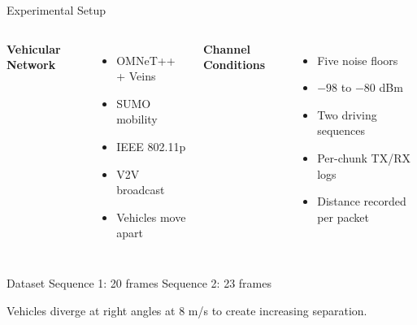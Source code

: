\documentclass[aspectratio=169]{beamer}
\begin{document}
\begin{frame}{Experimental Setup}

\begin{columns}[T]


\textbf{Vehicular Network}

\begin{itemize}
    \item OMNeT++ + Veins
    \item SUMO mobility
    \item IEEE 802.11p
    \item V2V broadcast
    \item Vehicles move apart
\end{itemize}


\textbf{Channel Conditions}

\begin{itemize}
    \item Five noise floors
    \item $-98$ to $-80$ dBm
    \item Two driving sequences
    \item Per-chunk TX/RX logs
    \item Distance recorded per packet
\end{itemize}

\end{columns}

\vspace{0.3cm}

\begin{block}{Dataset}
Sequence 1: 20 frames
\hspace{5cm}
Sequence 2: 23 frames
\end{block}

\vspace{0.15cm}

\begin{center}
\scriptsize
Vehicles diverge at right angles at 8 m/s to create increasing separation.
\end{center}

\end{frame}
\end{document}
